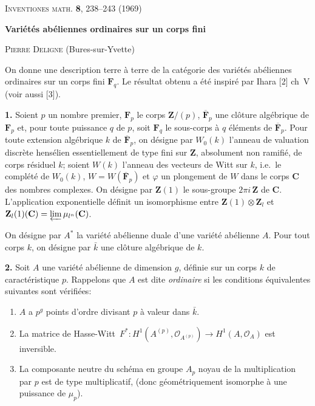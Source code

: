 \documentclass[10pt]{amsart}
\theoremstyle{plain}
\theoremstyle{remark}
\begin{document}
\noindent\textsc{Inventiones math.} \textbf{8}, 238--243 (1969)

\bigskip
\begin{center}
\Large\textbf{Vari\'et\'es ab\'eliennes ordinaires sur un corps fini}
\end{center}

\begin{center}
\textsc{Pierre Deligne} (Bures-sur-Yvette)
\end{center}

\bigskip
On donne une description terre \`a terre de la cat\'egorie des vari\'et\'es
ab\'eliennes ordinaires sur un corps fini $\mathbf{F}_q$.
Le r\'esultat obtenu a \'et\'e inspir\'e par Ihara [2] ch~V (voir aussi [3]).

\smallskip
\textbf{1.} Soient $p$ un nombre premier, $\mathbf{F}_p$ le corps
$\mathbf{Z}/(p)$, $\overline{\mathbf{F}}_p$ une cl\^oture alg\'ebrique de
$\mathbf{F}_p$ et, pour toute puissance $q$ de $p$, soit $\mathbf{F}_q$
le sous-corps \`a $q$ \'el\'ements de $\overline{\mathbf{F}}_p$.
Pour toute extension alg\'ebrique $k$ de $\overline{\mathbf{F}}_p$, on
d\'esigne par $W_0(k)$ l'anneau de valuation discr\`ete hens\'elien
essentiellement de type fini sur $\mathbf{Z}$, absolument non ramifi\'e,
de corps r\'esiduel $k$; soient $W(k)$ l'anneau des vecteurs de Witt
sur $k$, i.e.\ le compl\'et\'e de $W_0(k)$, $W = W(\overline{\mathbf{F}}_p)$
et $\varphi$ un plongement de $W$ dans le corps $\mathbf{C}$ des nombres
complexes. On d\'esigne par $\mathbf{Z}(1)$ le sous-groupe $2\pi i\,\mathbf{Z}$
de $\mathbf{C}$. L'application exponentielle d\'efinit un isomorphisme
entre $\mathbf{Z}(1) \otimes \mathbf{Z}_l$ et
$\mathbf{Z}_l(1)(\mathbf{C}) = \varprojlim \mu_{l^n}(\mathbf{C})$.

On d\'esigne par $A^*$ la vari\'et\'e ab\'elienne duale d'une vari\'et\'e
ab\'elienne $A$. Pour tout corps $k$, on d\'esigne par $\bar{k}$ une
cl\^oture alg\'ebrique de $k$.

\smallskip
\textbf{2.} Soit $A$ une vari\'et\'e ab\'elienne de dimension $g$, d\'efinie
sur un corps $k$ de caract\'eristique $p$. Rappelons que $A$ est dite
\emph{ordinaire} si les conditions \'equivalentes suivantes sont
v\'erifi\'ees:
\begin{enumerate}
\item[(I)] $A$ a $p^g$ points d'ordre divisant $p$ \`a valeur dans $\bar{k}$.
\item[(II)] La \guillemotleft matrice de Hasse-Witt\guillemotright\
$F^*\colon H^1(A^{(p)}, \mathscr{O}_{A^{(p)}}) \to H^1(A, \mathscr{O}_A)$
est inversible.
\item[(III)] La composante neutre du sch\'ema en groupe $A_p$ noyau de
la multiplication par $p$ est de type multiplicatif, (donc
g\'eom\'etriquement isomorphe \`a une puissance de $\mu_p$).
\end{enumerate}
\end{document}
